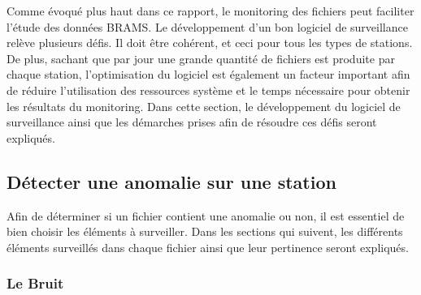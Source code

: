 \documentclass[11pt]{article}
\begin{document}
Comme évoqué plus haut dans ce rapport, le monitoring des fichiers peut faciliter l'étude des données BRAMS.
Le développement d'un bon logiciel de surveillance relève plusieurs défis.
Il doit être cohérent, et ceci pour tous les types de stations.
De plus, sachant que par jour une grande quantité de fichiers est produite par chaque station, l'optimisation du logiciel est également un facteur important afin de réduire l'utilisation des ressources système et le temps nécessaire pour obtenir les résultats du monitoring.
Dans cette section, le développement du logiciel de surveillance ainsi que les démarches prises afin de résoudre ces défis seront expliqués.

\subsection{Détecter une anomalie sur une station}

Afin de déterminer si un fichier contient une anomalie ou non, il est essentiel de bien choisir les éléments à surveiller.
Dans les sections qui suivent, les différents éléments surveillés dans chaque fichier ainsi que leur pertinence seront expliqués.

\subsubsection{Le Bruit}
\end{document}
